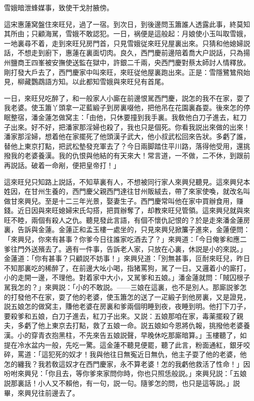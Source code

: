 雪娥暗泄蜂媒事，致使干戈肘腋傍。

這宋惠蓮窝盤住來旺兒，過了一宿。到次日，到後邊問玉簫誰人透露此事，終莫知其所由；只顧海駡，雪娥不敢認犯。一日，祸便是這般起：月娘使小玉叫取雪娥，一地裏尋不着，走到來旺兒房門首，只見雪娥従來旺兒屋裏出來。只猜和他媳婦説話，不想走到廚下，惠蓮在裏面切肉。良久，西門慶前邊陪着喬大户説話，只為揚州鹽商王四峯被安撫使送監在獄中，許銀二千兩，央西門慶對蔡太師討人情釋放。剛打發大戶去了，西門慶家中叫來旺，來旺従他屋裏跑出來。正是：雪隱鷺鷥飛始見，柳藏鸚鵡語方知。以此都知雪娥與來旺兒有首尾。

一日，來旺兒吃醉了，和一般家人小廝在前邊恨駡西門慶，説怎的我不在家，耍了我老婆。使玉簫丫頭拿一疋藍緞子到房裏啜他，把他吊在花園裏姦耍。後來怎的停眠整宿，潘金蓮怎做窝主：「由他，只休要撞到我手裏。我敎他白刀子進去，紅刀子出來。好不好，把潘家那淫婦也殺了，我也只是個死。你看我説出來做的出來！潘家那淫婦，想着他在家擺死了他頭漢子武大，他小叔武松回來告狀。多虧了誰，替他上東京打點，把武松墊發充軍去了？今日兩脚踏住平川路，落得他受用，還挑撥我的老婆養漢。我的仇恨與他結的有天來大！常言道，一不做，二不休，到跟前再説話。破着一命剐，便把皇帝打！」

這來旺兒只知路上説話，不知草裏有人，不想被同行家人來興兒聽見。這來興兒本姓因，在甘州生養的，西門慶父親西門達往甘州販絨去，帶了來家使喚，就改名叫做甘來興兒。至是十二三年光景，娶妻生子。西門慶常叫他在家中買辦食用，赚錢。近日因與來旺媳婦宋氏勾搭，把買辦奪了，却教來旺兒管領。這來興兒就與來旺不睦，兩個有殺人之仇。聽見發此言語，有個不懷仇記恨的？於是走來潘金蓮房裏，告訴與金蓮。金蓮正和孟玉樓一處坐的，只見來興兒掀簾子進來，金蓮便問：「來興兒，你來有甚事？你爹今日往誰家吃酒去了？」來興道：「今日俺爹和應二爹往門外送殯去了。適有一件事，告訴老人家，只放在心裏，休説是小的來説。」金蓮道：「你有甚事？只顧説不妨事！」來興兒道：「別無甚事，叵耐來旺兒，昨日不知那裏吃的稀醉了，在前邊大吆小喝，指猪罵狗，駡了一日。又邏着小的廝打，小的走開一邊，不理他。對着家中大小，又駡爹和五娘。」潘金蓮就問：「賊囚根子駡我怎的？」來興説：「小的不敢説。——三娘在這裏，也不是別人。那廝説爹怎的打發他不在家，耍了他的老婆，使玉簫怎的送了一疋緞子到他房裏，又是證見，説五娘怎的做窝主，賺他老婆在房裏和爹兩個明睡到夜，夜睡到明。他打下刀子，要殺爹和五娘，白刀子進去，紅刀子出來。又説：五娘那咱在家，毒薬擺殺了親夫，多虧了他上東京去打點，救了五娘一命。説五娘如今恩將仇報，挑撥他老婆養漢。小的穿青衣抱黑柱，不先來告五娘説聲，早晚休吃那廝暗算。」玉樓聽了，如提在冷水盆内一般，先吃一驚。這金蓮不聽見便罷，聽了此言，粉面通紅，銀牙咬碎，罵道：「這犯死的奴才！我與他往日無寃近日無仇，他主子耍了他的老婆，他怎的纏我？我若敎這奴才在西門慶家，永不算老婆！怎的我虧他救活了性命！」因吩咐來興兒：「你且去，等你爹來家問你時，你也只照恁般説。」來興兒説：「五娘説那裏話！小人又不賴他，有一句，説一句。隨爹怎的問，也只是這等説。」説畢，來興兒往前邊去了。

